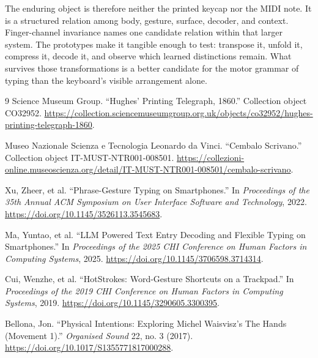 \documentclass[11pt]{article}
\begin{document}
The enduring object is therefore neither the printed keycap nor the MIDI note. It is a structured relation among body, gesture, surface, decoder, and context. Finger-channel invariance names one candidate relation within that larger system. The prototypes make it tangible enough to test: transpose it, unfold it, compress it, decode it, and observe which learned distinctions remain. What survives those transformations is a better candidate for the motor grammar of typing than the keyboard's visible arrangement alone.

\begin{thebibliography}{9}
Science Museum Group. ``Hughes' Printing Telegraph, 1860.'' Collection object CO32952. \url{https://collection.sciencemuseumgroup.org.uk/objects/co32952/hughes-printing-telegraph-1860}.

Museo Nazionale Scienza e Tecnologia Leonardo da Vinci. ``Cembalo Scrivano.'' Collection object IT-MUST-NTR001-008501. \url{https://collezioni-online.museoscienza.org/detail/IT-MUST-NTR001-008501/cembalo-scrivano}.

Xu, Zheer, et al. ``Phrase-Gesture Typing on Smartphones.'' In \emph{Proceedings of the 35th Annual ACM Symposium on User Interface Software and Technology}, 2022. \url{https://doi.org/10.1145/3526113.3545683}.

Ma, Yuntao, et al. ``LLM Powered Text Entry Decoding and Flexible Typing on Smartphones.'' In \emph{Proceedings of the 2025 CHI Conference on Human Factors in Computing Systems}, 2025. \url{https://doi.org/10.1145/3706598.3714314}.

Cui, Wenzhe, et al. ``HotStrokes: Word-Gesture Shortcuts on a Trackpad.'' In \emph{Proceedings of the 2019 CHI Conference on Human Factors in Computing Systems}, 2019. \url{https://doi.org/10.1145/3290605.3300395}.

Bellona, Jon. ``Physical Intentions: Exploring Michel Waisvisz's The Hands (Movement 1).'' \emph{Organised Sound} 22, no. 3 (2017). \url{https://doi.org/10.1017/S1355771817000288}.
\end{thebibliography}
\end{document}
